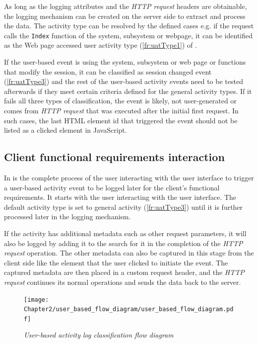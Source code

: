 As long as the logging attributes and the \textit{HTTP request} headers are obtainable, the logging mechanism can be created on the server side to extract and process the data. The activity type can be resolved by the defined cases e.g. if the request calls the \texttt{Index} function of the system, subsystem or webpage, it can be identified as the Web page accessed user activity type (\ref{fr:uatType1}) of .\par If the user-based event is using the system, subsystem or web page or functions that modify the session, it can be classified as session changed event (\ref{fr:uatType3}) and the rest of the user-based activity events need to be tested afterwards if they meet certain criteria defined for the general activity types. If it fails all three types of classification, the event is likely, not user-generated or comes from \textit{HTTP request} that was executed after the initial first request. In such cases, the last HTML element id that triggered the event should not be listed as a clicked element in JavaScript.

\subsection{Client functional requirements interaction}
\par In  is the complete process of the user interacting with the user interface to trigger a user-based activity event to be logged later for the client's functional requirements. It starts with the user interacting with the user interface. The default activity type is set to general activity (\ref{fr:uatType3}) until it is further processed later in the logging mechanism.\par If the activity has additional metadata such as other request parameters, it will also be logged by adding it to the search for it in the completion of the \textit{HTTP request} operation. The other metadata can also be captured in this stage from the client side like the element that the user clicked to initiate the event. The captured metadata are then placed in a custom request header, and the \textit{HTTP request} continues its normal operations and sends the data back to the server.

\clearpage

\begin{figure}[!htb] %
	\centering %
	\texttt{[image: Chapter2/user\_based\_flow\_diagram/user\_based\_flow\_diagram.pdf]}
	\caption[User-based activity log classification flow diagram]
	{\textit{User-based activity log classification flow diagram}}\label{fig:ch2_user_based_actvity_classification}
\end{figure}

